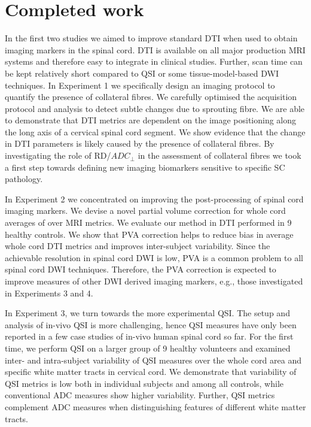 \section{Completed work}
In the first two studies we aimed to improve standard DTI when used to obtain imaging markers in the spinal cord. DTI is available on all major production MRI systems and therefore easy to integrate in clinical studies. Further, scan time can be kept relatively short compared to QSI or some tissue-model-based DWI techniques. In Experiment 1 we specifically design an imaging protocol to quantify the presence of collateral fibres. We carefully optimised the acquisition protocol and analysis to detect subtle changes due to sprouting fibre. We are able to demonstrate that DTI metrics are dependent on the image positioning along the long axis of a cervical spinal cord segment. We show evidence that the change in DTI parameters is likely caused by the presence of collateral fibres. By investigating the role of RD/$ADC_{\perp}$ in the assessment of collateral fibres we took a first step towards defining new imaging biomarkers sensitive to specific SC pathology.


In Experiment 2 we concentrated on improving the post-processing of spinal cord imaging markers. We devise a novel partial volume correction for whole cord averages of over MRI metrics. We evaluate our method in DTI performed in 9 healthy controls. We show that PVA correction helps to reduce bias in average whole cord DTI metrics and improves inter-subject variability. Since the achievable resolution in spinal cord DWI is low, PVA is a common problem to all spinal cord DWI techniques. Therefore, the PVA correction is expected to improve measures of other DWI derived imaging markers, e.g., those investigated in Experiments 3 and 4.


In Experiment 3, we turn towards the more experimental QSI. The setup and analysis of in-vivo QSI is more challenging, hence QSI measures have only been reported in a few case studies of in-vivo human spinal cord so far. For the first time, we perform QSI on a larger group of 9 healthy volunteers and examined inter- and intra-subject variability of QSI measures over the whole cord area and specific white matter tracts in cervical cord. We demonstrate that variability of QSI metrics is low both in individual subjects and among all controls, while conventional ADC measures show higher variability. Further, QSI metrics complement ADC measures when distinguishing features of different white matter tracts.


